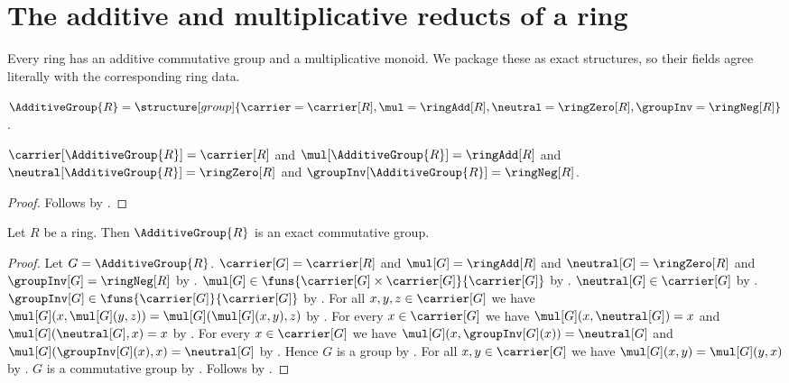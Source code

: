 


\section{The additive and multiplicative reducts of a ring}

Every ring has an additive commutative group and a multiplicative monoid.  We
package these as exact structures, so their fields agree literally with the
corresponding ring data.

\begin{definition}\label{additive_group}
    $\AdditiveGroup{R}=
        \structure[group]{
            \carrier=\carrier[R],
            \mul=\ringAdd[R],
            \neutral=\ringZero[R],
            \groupInv=\ringNeg[R]
        }$.
\end{definition}

\begin{proposition}\label{additive_group_fields}
    $\carrier[\AdditiveGroup{R}]=\carrier[R]$ and
    $\mul[\AdditiveGroup{R}]=\ringAdd[R]$ and
    $\neutral[\AdditiveGroup{R}]=\ringZero[R]$ and
    $\groupInv[\AdditiveGroup{R}]=\ringNeg[R]$.
\end{proposition}
\begin{proof}
    Follows by
        .
\end{proof}

\begin{theorem}\label{additive_group_is_exact_commutative_group}
    Let $R$ be a ring.
    Then $\AdditiveGroup{R}$ is an exact commutative group.
\end{theorem}
\begin{proof}
    Let $G=\AdditiveGroup{R}$.
    $\carrier[G]=\carrier[R]$ and $\mul[G]=\ringAdd[R]$ and
        $\neutral[G]=\ringZero[R]$ and
        $\groupInv[G]=\ringNeg[R]$ by
        .
    $\mul[G]\in\funs{\carrier[G]\times\carrier[G]}{\carrier[G]}$ by
        .
    $\neutral[G]\in\carrier[G]$ by .
    $\groupInv[G]\in\funs{\carrier[G]}{\carrier[G]}$ by
        .
    For all $x,y,z\in\carrier[G]$ we have
        $\mul[G](x,\mul[G](y,z))=\mul[G](\mul[G](x,y),z)$ by
        .
    For every $x\in\carrier[G]$ we have
        $\mul[G](x,\neutral[G])=x$ and
        $\mul[G](\neutral[G],x)=x$ by
        .
    For every $x\in\carrier[G]$ we have
        $\mul[G](x,\groupInv[G](x))=\neutral[G]$ and
        $\mul[G](\groupInv[G](x),x)=\neutral[G]$ by
        .
    Hence $G$ is a group by
        .
    For all $x,y\in\carrier[G]$ we have
        $\mul[G](x,y)=\mul[G](y,x)$ by
        .
    $G$ is a commutative group by
        .
    Follows by
        .
\end{proof}

